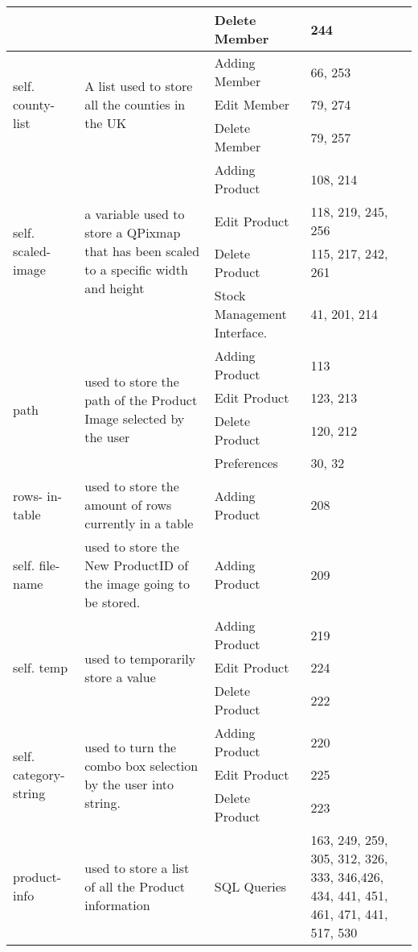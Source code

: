 \begin{center}
\begin{longtable}{|p{1.5cm}|p{4.5cm}|p{1.5cm}|p{3cm}|}
	& & Delete Member & 244 \\ \hline
	\multirow{3}{1.5cm}{self. county-list} & \multirow{3}{4.5cm}{A list used to  store all the counties in the UK} & Adding Member &  66, 253 \\ \cline{3-4}
	& & Edit Member & 79, 274 \\ \cline{3-4}
	& & Delete Member & 79, 257 \\ \hline
	\multirow{4}{1.5cm}{self. scaled-image} & \multirow{4}{4.5cm}{a variable used to store a QPixmap that has been scaled to a specific width and height} & Adding Product &  108, 214 \\ \cline{3-4}
	& & Edit Product & 118, 219, 245, 256 \\ \cline{3-4}
	& & Delete Product & 115, 217, 242, 261 \\ \cline{3-4}
	& & Stock Management Interface. & 41, 201, 214 \\ \hline
	\multirow{4}{1.5cm}{path} & \multirow{4}{4.5cm}{used to store the path of the Product Image selected by the user} & Adding Product & 113 \\ \cline{3-4}
	& & Edit Product & 123, 213 \\ \cline{3-4}
	& & Delete Product & 120, 212  \\ \cline{3-4}
	& & Preferences &  30, 32 \\ \hline
	rows- in-table & used to store the amount of rows currently in a table & Adding Product & 208 \\ \hline
	self. file-name & used to store the New ProductID of the image going to be stored. & Adding Product & 209 \\ \hline
	\multirow{3}{1.5cm}{self. temp} & \multirow{3}{4.5cm}{used to temporarily store a value} & Adding Product &  219 \\ \cline{3-4}
	& & Edit Product & 224 \\ \cline{3-4}
	& & Delete Product & 222 \\ \hline
	\multirow{3}{1.5cm}{self. category-string} & \multirow{3}{4.5cm}{used to turn the combo box selection by the user into string.} & Adding Product &  220 \\ \cline{3-4}
	& & Edit Product & 225 \\ \cline{3-4}
	& & Delete Product & 223 \\ \hline
	product-info & used to store a list of all the Product information & SQL Queries & 163, 249, 259, 305, 312, 326, 333, 346,426, 434, 441, 451, 461, 471, 441, 517, 530 \\ \hline

\end{longtable}
\end{center}
